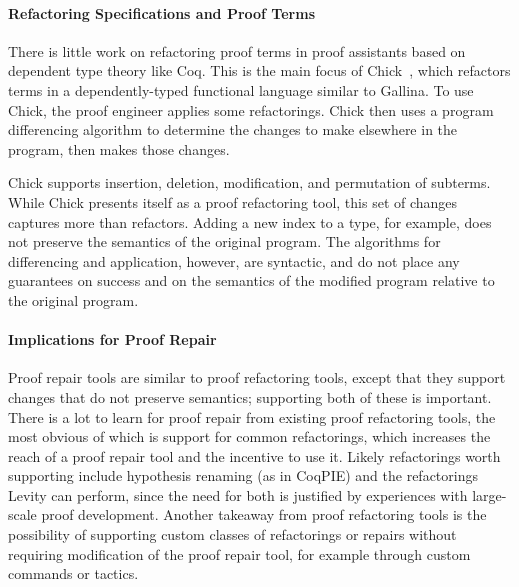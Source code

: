 
\paragraph{Refactoring Specifications and Proof Terms} %

There is little work on refactoring proof terms in proof assistants based on dependent type theory like Coq.
This is the main focus of Chick~\cite{robert2018front}, which refactors terms in a dependently-typed functional language
similar to Gallina. To use Chick, the proof engineer applies some refactorings.
Chick then uses a program differencing algorithm to determine the changes to make elsewhere in the program,
then makes those changes.

Chick supports insertion, deletion, modification, and permutation of subterms.
While Chick presents itself as a proof refactoring tool,
this set of changes captures more than refactors.
Adding a new index to a type, for example, does not preserve the semantics of the original program.
The algorithms for differencing and application, however, are syntactic, and do not place any guarantees on
success and on the semantics of the modified program relative to the original program.

\paragraph{Implications for Proof Repair}

Proof repair tools are similar to proof refactoring tools,
except that they support changes that do not preserve semantics; supporting
both of these is important. There is a lot to learn for proof repair from existing proof refactoring tools,
the most obvious of which is support for common
refactorings, which increases the reach of a proof repair tool and the incentive to use it.
Likely refactorings worth supporting include hypothesis renaming (as in CoqPIE) and the refactorings Levity can perform, since
the need for both is justified by experiences with large-scale proof development.
Another takeaway from proof refactoring tools is the possibility of supporting custom classes of refactorings or
repairs without requiring modification of the proof repair tool,
for example through custom commands or tactics.

